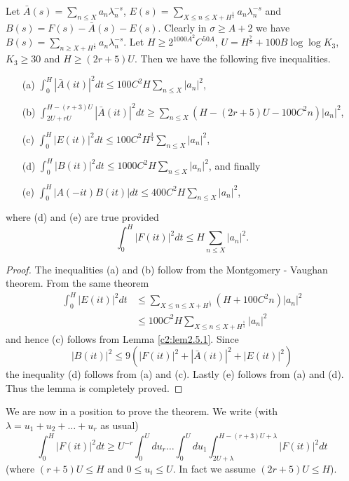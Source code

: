 \begin{sublemma}\label{c2:lem2.5.2}
Let $\bar{A}(s) = \sum\limits_{n \leq X} a_n \lambda^{-s}_n$, $E(s) = \sum\limits_{X \leq n \leq X + H^{\frac{1}{4}}} a_n \lambda^{-s}_n$ and $B(s) = F(s) - \bar{A}(s) - E(s)$. Clearly in $\sigma \geq A + 2$ we have $B(s) = \sum\limits_{n \geq X + H^{\frac{1}{4}}} a_n\lambda^{-s}_n$. Let $H \geq 2^{1000 A^2} C^{50 A}$, $U = H^{\frac{7}{8}} + 100 B \log \log K_3$, $K_3 \geq 30$ and $H \geq (2r + 5) U$. Then we have the following five inequalities. 
\begin{itemize}
\item[{\rm (a)}] $\int^H_0 |\bar{A}(it)|^2 dt \leq 100 C^2 H \sum\limits_{n \leq X} |a_n|^2$, 

\item[{\rm (b)}] $\int^{H-(r+3)U}_{2U+rU} |\bar{A}(it)|^2 dt \geq \sum\limits_{n \leq X} (H - (2r + 5) U - 100 C^2 n)|a_n|^2$,

\item[{\rm (c)}]  $\int^{H}_0 |E(it)|^2 dt \leq 100 C^2 H^{\frac{3}{4}} \sum\limits_{n\leq X} |a_n|^2$,\pageoriginale 

\item[{\rm (d)}]  $\int^H_0 |B(it)|^2 dt \leq 1000 C^2 H \sum\limits_{n\leq X} |a_n|^2$,
and finally

\item[{\rm (e)}]  $\int^H_0 |A(-it) B( it)| dt \leq 400 C^2 H \sum\limits_{n\leq X} |a_n|^2$,
\end{itemize}
where (d) and (e) are true provided 
$$
\int^H_0 |F(it)|^2 dt \leq H \sum\limits_{n \leq X} |a_n|^2.
$$
\end{sublemma}

\begin{proof}
The inequalities (a) and (b) follow from the Montgomery - Vau\-ghan theorem. From the same theorem
\begin{align*}
\int^H_0 |E(it)|^2 dt & \leq \sum\limits_{X \leq n \leq X + H^{\frac{1}{4}}} (H+ 100 C^2 n) |a_n|^2 \\
& \leq 100 C^2 H \sum\limits_{X \leq n \leq X + H^{\frac{1}{4}}} |a_n|^2
\end{align*}
and hence (c) follows from Lemma \ref{c2:lem2.5.1}. Since
$$
|B(it)|^2 \leq 9 (|F(it)|^2 + |\bar{A} (it)|^2 + |E(it)|^2)
$$
the inequality (d) follows from (a) and (c). Lastly (e) follows from (a) and (d). Thus the lemma is completely proved.
\end{proof}

We are now in a position to prove the theorem. We write (with $\lambda = u_1 + u_2 + \ldots + u_r$ as usual)
$$
\int^H_0 |F(it)|^2 dt \geq U^{-r} \int^U_0 du_r \ldots \int^U_0 du_1 \int^{H-(r+3) U+\lambda}_{2U+\lambda } |F(it)|^2 dt
$$
(where $(r+5) U \leq H$ and $0 \leq u_i \leq U$. In fact we assume $(2r+5) U \leq H$).

